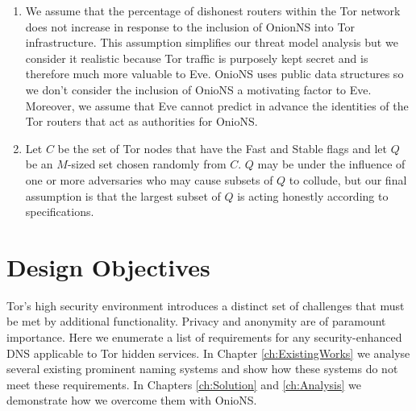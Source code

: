 \begin{enumerate}
	\item We assume that the percentage of dishonest routers within the Tor network does not increase in response to the inclusion of OnionNS into Tor infrastructure. This assumption simplifies our threat model analysis but we consider it realistic because Tor traffic is purposely kept secret and is therefore much more valuable to Eve. OnioNS uses public data structures so we don't consider the inclusion of OnioNS a motivating factor to Eve. Moreover, we assume that Eve cannot predict in advance the identities of the Tor routers that act as authorities for OnioNS.
	\item Let $ C $ be the set of Tor nodes that have the Fast and Stable flags and let $ Q $ be an $ M $-sized set chosen randomly from $ C $. $ Q $ may be under the influence of one or more adversaries who may cause subsets of $ Q $ to collude, but our final assumption is that the largest subset of $ Q $ is acting honestly according to specifications.
\end{enumerate}

\section{Design Objectives}
\label{sec:Objectives}

Tor's high security environment introduces a distinct set of challenges that must be met by additional functionality. Privacy and anonymity are of paramount importance. Here we enumerate a list of requirements for any security-enhanced DNS applicable to Tor hidden services. In Chapter \ref{ch:ExistingWorks} we analyse several existing prominent naming systems and show how these systems do not meet these requirements. In Chapters \ref{ch:Solution} and \ref{ch:Analysis} we demonstrate how we overcome them with OnioNS.

